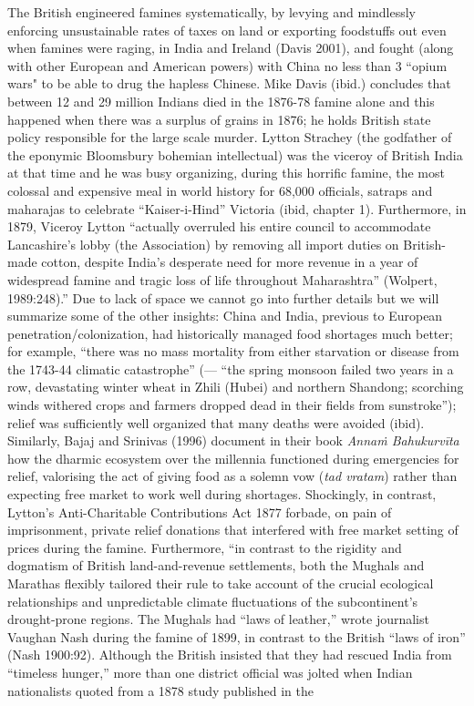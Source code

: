The British engineered famines systematically, by levying and mindlessly enforcing unsustainable rates of taxes on land or exporting foodstuffs out even when famines were raging, in India and Ireland (Davis 2001), and fought (along with other European and American powers) with China no less than 3 ``opium wars" to be able to drug the hapless Chinese. Mike Davis (ibid.) concludes that between 12 and 29 million Indians died in the 1876-78 famine alone and this happened when there was a surplus of grains in 1876; he holds British state policy responsible for the large scale murder. Lytton Strachey (the godfather of the eponymic Bloomsbury bohemian intellectual) was the viceroy of British India at that time and he was busy organizing, during this horrific famine, the most colossal and expensive meal in world history for 68,000 officials, satraps and maharajas to celebrate “Kaiser-i-Hind” Victoria (ibid, chapter 1). Furthermore, in 1879, Viceroy Lytton “actually overruled his entire council to accommodate Lancashire’s lobby (the Association) by removing all import duties on British-made cotton, despite India’s desperate need for more revenue in a year of widespread famine and tragic loss of life throughout Maharashtra” (Wolpert, 1989:248).” Due to lack of space we cannot go into further details but we will summarize some of the other insights: China and India, previous to European penetration/colonization, had historically managed food shortages much better; for example, “there was no mass mortality from either starvation or disease from the 1743-44 climatic catastrophe” (--- “the spring monsoon failed two years in a row, devastating winter wheat in Zhili (Hubei) and northern Shandong; scorching winds withered crops and farmers dropped dead in their fields from sunstroke”); relief was sufficiently well organized that many deaths were avoided (ibid). Similarly, Bajaj and Srinivas (1996) document in their book {\sl Annaṁ Bahukurvīta} how the dharmic ecosystem over the millennia  functioned during emergencies for relief, valorising the act of giving food as a solemn vow ({\sl tad vratam}) rather than expecting free market to work well during shortages. Shockingly, in contrast, Lytton's Anti-Charitable Contributions Act 1877 forbade, on pain of imprisonment, private relief donations that interfered with free market setting of prices during the famine.  Furthermore, “in contrast to the rigidity and dogmatism of British land-and-revenue settlements, both the Mughals and Marathas flexibly tailored their rule to take account of the crucial ecological relationships and unpredictable climate fluctuations of the subcontinent’s drought-prone regions. The Mughals had “laws of leather,” wrote journalist Vaughan Nash during the famine of 1899, in contrast to the British “laws of iron” (Nash 1900:92). Although the British insisted that they had rescued India from “timeless hunger,” more than one district official was jolted when Indian nationalists quoted from a 1878 study published in the 